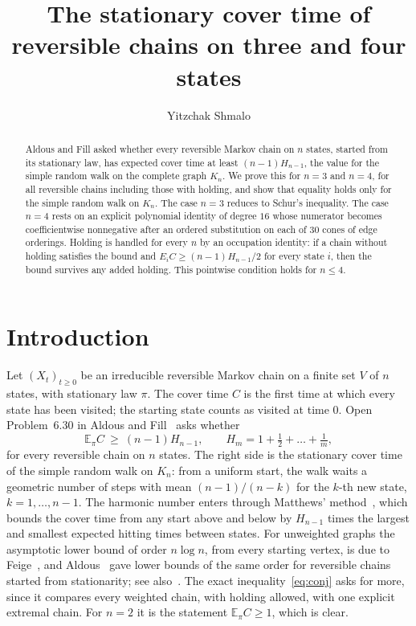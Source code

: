 \documentclass[11pt]{amsart}
\title{The stationary cover time of reversible chains on three and four states}
\author{Yitzchak Shmalo}
\date{}
\theoremstyle{remark}
\newcommand{\E}{\mathbb{E}}
\begin{document}
\begin{abstract}
Aldous and Fill asked whether every reversible Markov chain on $n$ states, started from its stationary law, has
expected cover time at least $(n-1)H_{n-1}$, the value for the simple random walk on the complete graph $K_n$. We
prove this for $n=3$ and $n=4$, for all reversible chains including those with holding, and show that equality holds
only for the simple random walk on $K_n$. The case $n=3$ reduces to Schur's inequality. The case $n=4$ rests on an
explicit polynomial identity of degree $16$ whose numerator becomes coefficientwise nonnegative after an ordered
substitution on each of $30$ cones of edge orderings. Holding is handled for every $n$ by an occupation identity: if a chain
without holding satisfies the bound and $E_iC\ge (n-1)H_{n-1}/2$ for every state $i$, then the bound survives any
added holding. This pointwise condition holds for $n\le 4$.
\end{abstract}

\maketitle

\section{Introduction}

Let $(X_t)_{t\ge0}$ be an irreducible reversible Markov chain on a finite set $V$ of $n$ states, with stationary law
$\pi$. The cover time $C$ is the first time at which every state has been visited; the starting state counts as
visited at time $0$. Open Problem~6.30 in Aldous and Fill~\cite{AF} asks whether
\begin{equation}\label{eq:conj}
\E_\pi C\ \ge\ (n-1)H_{n-1},\qquad H_m=1+\tfrac12+\dots+\tfrac1m,
\end{equation}
for every reversible chain on $n$ states. The right side is the stationary cover time of the simple random walk on
$K_n$: from a uniform start, the walk waits a geometric number of steps with mean $(n-1)/(n-k)$ for the $k$-th new
state, $k=1,\dots,n-1$. The harmonic number enters through Matthews' method~\cite{Mat}, which bounds the cover time from
any start above and below by $H_{n-1}$ times the largest and smallest expected hitting times between states. For
unweighted graphs the asymptotic lower bound of order $n\log n$, from every starting vertex, is due to
Feige~\cite{Feige}, and Aldous~\cite{Al89} gave lower bounds of the same order for reversible chains started from
stationarity; see also~\cite[Chapter~6]{AF}. The exact inequality~\eqref{eq:conj} asks for
more, since it compares every weighted chain, with holding allowed, with one explicit extremal chain. For $n=2$ it is
the statement $\E_\pi C\ge 1$, which is clear.
\end{document}
